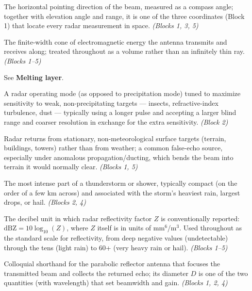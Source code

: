 \documentclass[11pt]{article}
\newcommand{\term}[1]{\textbf{#1}}
\begin{document}
\begin{description}[leftmargin=2.4cm,style=nextline]

\item[Azimuth] The horizontal pointing direction of the beam, measured as a compass angle; together with elevation angle and range, it is one of the three coordinates (Block 1) that locate every radar measurement in space. \emph{(Blocks 1, 3, 5)}

\item[Beam (radar beam)] The finite-width cone of electromagnetic energy the antenna transmits and receives along; treated throughout as a volume rather than an infinitely thin ray. \emph{(Blocks 1--5)}

\item[Bright band] See \term{Melting layer}.

\item[Clear-air mode] A radar operating mode (as opposed to precipitation mode) tuned to maximize sensitivity to weak, non-precipitating targets --- insects, refractive-index turbulence, dust --- typically using a longer pulse and accepting a larger blind range and coarser resolution in exchange for the extra sensitivity. \emph{(Block 2)}

\item[Clutter (ground clutter)] Radar returns from stationary, non-meteorological surface targets (terrain, buildings, towers) rather than from weather; a common false-echo source, especially under anomalous propagation/ducting, which bends the beam into terrain it would normally clear. \emph{(Blocks 1, 5)}

\item[Convective core] The most intense part of a thunderstorm or shower, typically compact (on the order of a few km across) and associated with the storm's heaviest rain, largest drops, or hail. \emph{(Blocks 2, 4)}

\item[dBZ] The decibel unit in which radar reflectivity factor $Z$ is conventionally reported: $\mathrm{dBZ} = 10\log_{10}(Z)$, where $Z$ itself is in units of mm$^6$/m$^3$. Used throughout as the standard scale for reflectivity, from deep negative values (undetectable) through the tens (light rain) to 60+ (very heavy rain or hail). \emph{(Blocks 1--5)}

\item[Dish] Colloquial shorthand for the parabolic reflector antenna that focuses the transmitted beam and collects the returned echo; its diameter $D$ is one of the two quantities (with wavelength) that set beamwidth and gain. \emph{(Blocks 1, 2, 4)}


\end{description}
\end{document}
